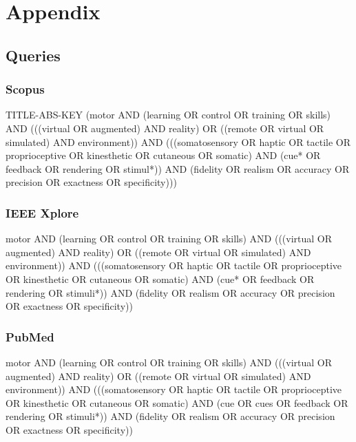 
\section*{Appendix}

\subsection{Queries}
\label{sec:queries}

\subsubsection{Scopus}
TITLE-ABS-KEY (motor AND (learning OR control OR training OR skills) AND (((virtual OR augmented) AND reality) OR ((remote OR virtual OR simulated) AND environment)) AND (((somatosensory OR haptic OR tactile OR proprioceptive OR kinesthetic OR cutaneous OR somatic) AND (cue* OR feedback OR rendering OR stimul*)) AND (fidelity OR realism OR accuracy OR precision OR exactness OR specificity)))

\subsubsection{IEEE Xplore}
motor AND (learning OR control OR training OR skills) AND (((virtual OR augmented) AND reality) OR ((remote OR virtual OR simulated) AND environment)) AND (((somatosensory OR haptic OR tactile OR proprioceptive OR kinesthetic OR cutaneous OR somatic) AND (cue* OR feedback OR rendering OR stimuli*)) AND (fidelity OR realism OR accuracy OR precision OR exactness OR specificity)) 

\subsubsection{PubMed}
motor AND (learning OR control OR training OR skills) AND (((virtual OR augmented) AND reality) OR ((remote OR virtual OR simulated) AND environment)) AND (((somatosensory OR haptic OR tactile OR proprioceptive OR kinesthetic OR cutaneous OR somatic) AND (cue OR cues OR feedback OR rendering OR stimuli*)) AND (fidelity OR realism OR accuracy OR precision OR exactness OR specificity))



\newpage
\begin{landscape}
\setlength{\tabcolsep}{2pt} %

\end{landscape}


